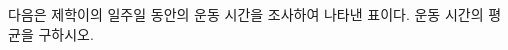 다음은 제학이의 일주일 동안의 운동 시간을 조사하여 나타낸 표이다. 운동 시간의 평균을 구하시오.
\par\smallskip\begin{center}\resizebox{\ifdim\width>\linewidth\linewidth\else\width\fi}{!}{}\end{center}

